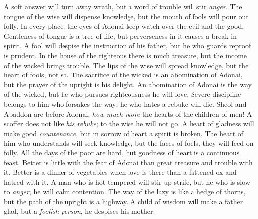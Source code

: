 \begin{biblechapter} %
\verse A soft answer will turn away wrath, 
but a word of trouble will stir \textit{anger}.
\verse The tongue of the wise will dispense knowledge, 
but the mouth of fools will pour out folly.
\verse In every place, the eyes of Adonai 
keep watch over the evil and the good.
\verse Gentleness of tongue is a tree of life, 
but perverseness in it causes a break in spirit.
\verse A fool will despise the instruction of his father, 
but he who guards reproof is prudent.
\verse In the house of the righteous there is much treasure, 
but the income of the wicked brings trouble.
\verse The lips of the wise will spread knowledge, 
but the heart of fools, not so.
\verse The sacrifice of the wicked is an abomination of Adonai, 
but the prayer of the upright is his delight.
\verse An abomination of Adonai is the way of the wicked, 
but he who pursues righteousness he will love.
\verse Severe discipline belongs to him who forsakes the way; 
he who hates a rebuke will die.
\verse Sheol and Abaddon are before Adonai, 
\textit{how much more} the hearts of the children of men!
\verse A scoffer does not like \textit{his rebuke}; 
to the wise he will not go.
\verse A heart of gladness will make good \textit{countenance}, 
but in sorrow of heart a spirit is broken.
\verse The heart of him who understands will seek knowledge, 
but the faces of fools, they will feed on folly.
\verse All the days of the poor are hard, 
but goodness of heart is a continuous feast.
\verse Better is little with the fear of Adonai 
than great treasure and trouble with it.
\verse Better is a dinner of vegetables when love is there 
than a fattened ox and hatred with it.
\verse A man who is hot-tempered will stir up strife, 
but he who is slow to \textit{anger}, he will calm contention.
\verse The way of the lazy is like a hedge of thorns, 
but the path of the upright is a highway.
\verse A child of wisdom will make a father glad, 
but a \textit{foolish person}, he despises his mother.

\end{biblechapter}
